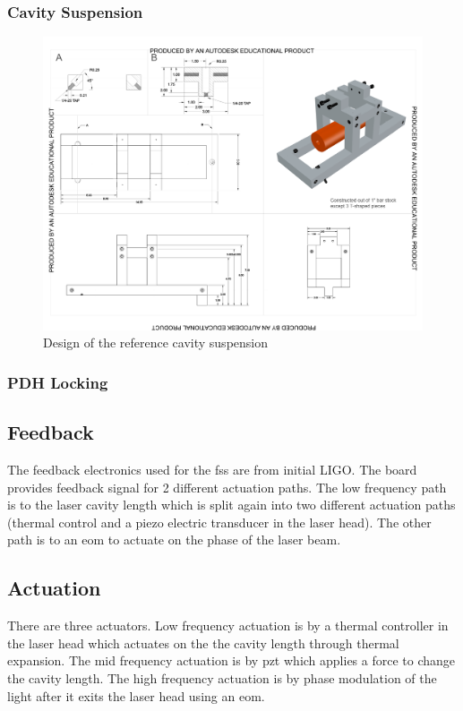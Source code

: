 \subsubsection{Cavity Suspension}
\begin{figure}[htbp]
	\centering
		\includegraphics[width=15cm]{./figures/refcavsusdesign.pdf}
	\caption[Reference Cavity Suspension Design]{Design of the reference cavity suspension}
	\label{fig:refcav_sus}
\end{figure}

\subsubsection{PDH Locking}

\subsection{Feedback}
The feedback electronics used for the \ac{fss} are from initial LIGO. The board
provides feedback signal for 2 different actuation paths. The low frequency path
is to the laser cavity length which is split again into two different actuation
paths (thermal control and a piezo electric transducer in the laser head). The
other path is to an \ac{eom} to actuate on the phase of the laser beam.

\subsection{Actuation}

There are three actuators. Low frequency actuation is by a thermal controller in
the laser head which actuates on the the cavity length through thermal expansion.
The mid frequency actuation is by \ac{pzt} which applies a force to change the
cavity length. The high frequency actuation is by phase modulation of the light
after it exits the laser head using an \ac{eom}.

